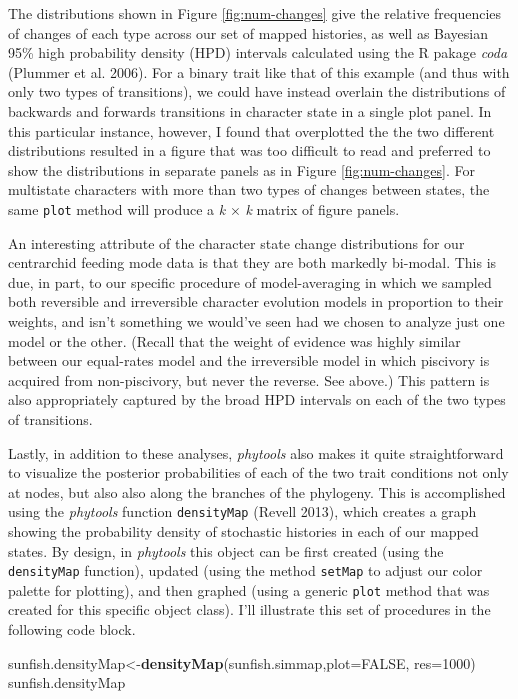 \documentclass[fleqn,10pt,lineno]{wlpeerj} %
\newenvironment{Shaded}{\begin{snugshade}}{\end{snugshade}}
\newcommand{\AttributeTok}[1]{\textcolor[rgb]{0.13,0.29,0.53}{#1}}
\newcommand{\ConstantTok}[1]{\textcolor[rgb]{0.56,0.35,0.01}{#1}}
\newcommand{\DecValTok}[1]{\textcolor[rgb]{0.00,0.00,0.81}{#1}}
\newcommand{\FunctionTok}[1]{\textcolor[rgb]{0.13,0.29,0.53}{\textbf{#1}}}
\newcommand{\NormalTok}[1]{#1}
\newcommand{\OtherTok}[1]{\textcolor[rgb]{0.56,0.35,0.01}{#1}}
\begin{document}
The distributions shown in Figure \ref{fig:num-changes} give the relative frequencies of changes of each type across our set of mapped histories, as well as Bayesian 95\% high probability density (HPD) intervals calculated using the R pakage \emph{coda} (Plummer et al. 2006). For a binary trait like that of this example (and thus with only two types of transitions), we could have instead overlain the distributions of backwards and forwards transitions in character state in a single plot panel. In this particular instance, however, I found that overplotted the the two different distributions resulted in a figure that was too difficult to read and preferred to show the distributions in separate panels as in Figure \ref{fig:num-changes}. For multistate characters with more than two types of changes between states, the same \texttt{plot} method will produce a \emph{k} \(\times\) \emph{k} matrix of figure panels.

An interesting attribute of the character state change distributions for our centrarchid feeding mode data is that they are both markedly bi-modal. This is due, in part, to our specific procedure of model-averaging in which we sampled both reversible and irreversible character evolution models in proportion to their weights, and isn't something we would've seen had we chosen to analyze just one model or the other. (Recall that the weight of evidence was highly similar between our equal-rates model and the irreversible model in which piscivory is acquired from non-piscivory, but never the reverse. See above.) This pattern is also appropriately captured by the broad HPD intervals on each of the two types of transitions.

Lastly, in addition to these analyses, \emph{phytools} also makes it quite straightforward to visualize the posterior probabilities of each of the two trait conditions not only at nodes, but also also along the branches of the phylogeny. This is accomplished using the \emph{phytools} function \texttt{densityMap} (Revell 2013), which creates a graph showing the probability density of stochastic histories in each of our mapped states. By design, in \emph{phytools} this object can be first created (using the \texttt{densityMap} function), updated (using the method \texttt{setMap} to adjust our color palette for plotting), and then graphed (using a generic \texttt{plot} method that was created for this specific object class). I'll illustrate this set of procedures in the following code block.

\begin{Shaded}
\begin{Highlighting}[]
\NormalTok{sunfish.densityMap}\OtherTok{\textless{}{-}}\FunctionTok{densityMap}\NormalTok{(sunfish.simmap,}\AttributeTok{plot=}\ConstantTok{FALSE}\NormalTok{,}
  \AttributeTok{res=}\DecValTok{1000}\NormalTok{)}
\NormalTok{sunfish.densityMap}
\end{Highlighting}
\end{Shaded}
\end{document}
